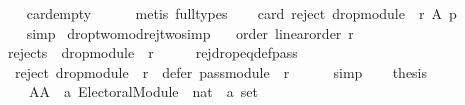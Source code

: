\begin{isabellebody}
\ \ \ \ \isamarkupfalse%
\ card{\isachardot}{\kern0pt}empty\isanewline
\ \ \ \ \isamarkupfalse%
\ {\isacharparenleft}{\kern0pt}metis\ {\isacharparenleft}{\kern0pt}full{\isacharunderscore}{\kern0pt}types{\isacharparenright}{\kern0pt}{\isacharparenright}{\kern0pt}\isanewline
\ \ \isamarkupfalse%
\ {\isachardoublequoteopen}card\ {\isacharparenleft}{\kern0pt}reject\ {\isacharparenleft}{\kern0pt}drop{\isacharunderscore}{\kern0pt}module\ {}\ r{\isacharparenright}{\kern0pt}\ A\ p{\isacharparenright}{\kern0pt}\ {\isacharequal}{\kern0pt}\ {}{\isachardoublequoteclose}\isanewline
\ \ \ \ \isamarkupfalse%
\ simp\isanewline
{}\isamarkupfalse%
%
\endisatagproof
{\isafoldproof}%
%
\isadelimproof
\isanewline
%
\endisadelimproof
\isanewline
\isanewline
{}\isamarkupfalse%
\ drop{\isacharunderscore}{\kern0pt}two{\isacharunderscore}{\kern0pt}mod{\isacharunderscore}{\kern0pt}rej{\isacharunderscore}{\kern0pt}two{\isacharbrackleft}{\kern0pt}simp{\isacharbrackright}{\kern0pt}{\isacharcolon}{\kern0pt}\isanewline
\ \ \ order{\isacharcolon}{\kern0pt}\ {\isachardoublequoteopen}linear{\isacharunderscore}{\kern0pt}order\ r{\isachardoublequoteclose}\isanewline
\ \ \ {\isachardoublequoteopen}rejects\ {}\ {\isacharparenleft}{\kern0pt}drop{\isacharunderscore}{\kern0pt}module\ {}\ r{\isacharparenright}{\kern0pt}{\isachardoublequoteclose}\isanewline
%
\isadelimproof
%
\endisadelimproof
%
\isatagproof
{}\isamarkupfalse%
\ {\isacharminus}{\kern0pt}\isanewline
\ \ \isamarkupfalse%
\ rej{\isacharunderscore}{\kern0pt}drop{\isacharunderscore}{\kern0pt}eq{\isacharunderscore}{\kern0pt}def{\isacharunderscore}{\kern0pt}pass{\isacharcolon}{\kern0pt}\isanewline
\ \ \ \ {\isachardoublequoteopen}reject\ {\isacharparenleft}{\kern0pt}drop{\isacharunderscore}{\kern0pt}module\ {}\ r{\isacharparenright}{\kern0pt}\ {\isacharequal}{\kern0pt}\ defer\ {\isacharparenleft}{\kern0pt}pass{\isacharunderscore}{\kern0pt}module\ {}\ r{\isacharparenright}{\kern0pt}{\isachardoublequoteclose}\isanewline
\ \ \ \ \isamarkupfalse%
\ simp\isanewline
\ \ \isamarkupfalse%
\ {\isacharquery}{\kern0pt}thesis\isanewline
\ \ \isamarkupfalse%
\ {\isacharminus}{\kern0pt}\isanewline
\ \ \ \ \isamarkupfalse%
\isanewline
\ \ \ \ \ \ AA\ {\isacharcolon}{\kern0pt}{\isacharcolon}{\kern0pt}\ {\isachardoublequoteopen}{\isacharparenleft}{\kern0pt}{\isacharprime}{\kern0pt}a\ Electoral{\isacharunderscore}{\kern0pt}Module{\isacharparenright}{\kern0pt}\ {\isasymRightarrow}\ nat\ {\isasymRightarrow}\ {\isacharprime}{\kern0pt}a\ set{\isachardoublequoteclose}\ \isanewline

\end{isabellebody}
